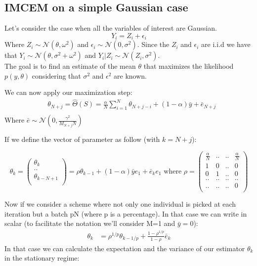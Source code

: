 \documentclass[a0,portrait]{a0poster}
\begin{document}
\begin{multicols}{2}
\subsection{IMCEM on a simple Gaussian case}
Let's consider the case when all the variables of interest are Gaussian.
\begin{equation*}
Y_i = Z_i + \epsilon_i
\end{equation*}
Where $Z_i \sim \mathcal{N}(\theta,\omega^2)$ and $\epsilon_i \sim \mathcal{N}(0,\sigma^2)$.
Since the $Z_i$ and $\epsilon_i$ are i.i.d we have that $Y_i \sim \mathcal{N}(\theta,\sigma^2 + \omega^2)$ and $Y_i|Z_i \sim \mathcal{N}(Z_i,\sigma^2)$.\\
The goal is to find an estimate of the mean $\theta$ that maximizes the likelihood $p(y,\theta)$ considering that $\sigma^2$ and $\epsilon^2$ are known.

\noindent We can now apply our maximization step:
\begin{equation*}
\begin{split}
& \theta_{N+j} = \hat{\Theta}(S) = \frac{\alpha}{N} \sum_{i=1}^{N}{\theta_{N+j-i}} + (1-\alpha)\bar{y} + \bar{e}_{N+j}\\
\end{split}
\end{equation*}
Where $\bar{e} \sim \mathcal{N}(0, \frac{\gamma^2}{M_{N+j}N})$

If we define the vector of parameter as follow (with $k=N+j$):

\begin{equation*}
\theta_{k} = 
\left(
\begin{array}{c}
\theta_{k}\\
..\\
\theta_{k-N+1}\\
\end{array}
\right) = \rho \theta_{k-1} + (1-\alpha)\bar{y}e_1 + \bar{e}_k e_1
\textrm{  where  } \rho = \begin{pmatrix} 
\frac{\alpha}{N} & .. & .. & \frac{\alpha}{N} \\
1 & 0 & .. & 0\\
0 & 1 & .. & 0\\
.. & .. & .. & ..\\
.. & .. & .. & 0\\
\end{pmatrix}
\end{equation*}


\noindent Now if we consider a scheme where not only one individual is picked at each iteration but a batch pN (where p is a percentage). In that case we can write in scalar (to facilitate the notation we'll consider M=1 and $\bar{y} = 0$):
\begin{equation*}
\begin{split}
\theta_k & = \rho^{1/p} \theta_{k-1/p} + \frac{1-\rho^{1/p}}{1-\rho}\bar{e}_k
\end{split}
\end{equation*}
In that case we can calculate the expectation and the variance of our estimator $\theta_k$ in the stationary regime:


\end{multicols}
\end{document}
